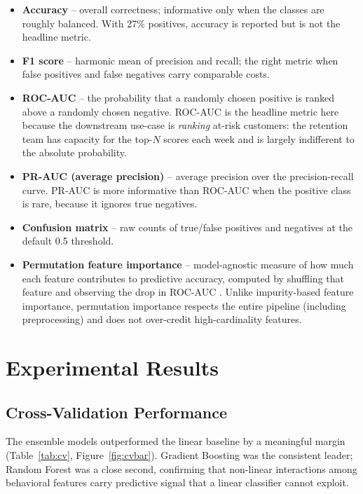 \documentclass[11pt,a4paper]{article}
\begin{document}
\begin{itemize}
  \item \textbf{Accuracy} -- overall correctness; informative only
        when the classes are roughly balanced. With 27\% positives,
        accuracy is reported but is not the headline metric.
  \item \textbf{F1 score} -- harmonic mean of precision and recall;
        the right metric when false positives and false negatives
        carry comparable costs.
  \item \textbf{ROC-AUC} -- the probability that a randomly chosen
        positive is ranked above a randomly chosen negative. ROC-AUC
        is the headline metric here because the downstream use-case
        is \emph{ranking} at-risk customers: the retention team has
        capacity for the top-$N$ scores each week and is largely
        indifferent to the absolute probability.
  \item \textbf{PR-AUC (average precision)} -- average precision over
        the precision-recall curve. PR-AUC is more informative than
        ROC-AUC when the positive class is rare, because it ignores
        true negatives.
  \item \textbf{Confusion matrix} -- raw counts of true/false
        positives and negatives at the default 0.5 threshold.
  \item \textbf{Permutation feature importance} -- model-agnostic
        measure of how much each feature contributes to predictive
        accuracy, computed by shuffling that feature and observing
        the drop in ROC-AUC \cite{breiman2001random}. Unlike
        impurity-based feature importance, permutation importance
        respects the entire pipeline (including preprocessing) and
        does not over-credit high-cardinality features.
\end{itemize}

\section{Experimental Results}

\subsection{Cross-Validation Performance}

The ensemble models outperformed the linear baseline by a meaningful
margin (Table~\ref{tab:cv}, Figure~\ref{fig:cvbar}). Gradient Boosting
was the consistent leader; Random Forest was a close second, confirming
that non-linear interactions among behavioral features carry
predictive signal that a linear classifier cannot exploit.
\end{document}

